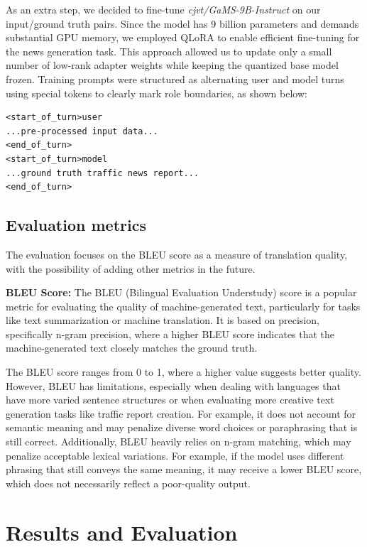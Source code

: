 \documentclass[fleqn,moreauthors,10pt]{ds_report}
\begin{document}
As an extra step, we decided to fine-tune \textit{cjvt/GaMS-9B-Instruct} on our input/ground truth pairs. Since the model has 9 billion parameters and demands substantial GPU memory, we employed QLoRA to enable efficient fine-tuning for the news generation task. This approach allowed us to update only a small number of low-rank adapter weights while keeping the quantized base model frozen. Training prompts were structured as alternating user and model turns using special tokens to clearly mark role boundaries, as shown below:

\begin{verbatim}
<start_of_turn>user
...pre-processed input data...
<end_of_turn>
<start_of_turn>model
...ground truth traffic news report...
<end_of_turn>
\end{verbatim}

\subsection*{Evaluation metrics}

The evaluation focuses on the BLEU score as a measure of translation quality, with the possibility of adding other metrics in the future.

\noindent \textbf{BLEU Score:} The BLEU (Bilingual Evaluation Understudy) score is a popular metric for evaluating the quality of machine-generated text, particularly for tasks like text summarization or machine translation. It is based on precision, specifically n-gram precision, where a higher BLEU score indicates that the machine-generated text closely matches the ground truth.

The BLEU score ranges from 0 to 1, where a higher value suggests better quality. However, BLEU has limitations, especially when dealing with languages that have more varied sentence structures or when evaluating more creative text generation tasks like traffic report creation. For example, it does not account for semantic meaning and may penalize diverse word choices or paraphrasing that is still correct. Additionally, BLEU heavily relies on n-gram matching, which may penalize acceptable lexical variations. For example, if the model uses different phrasing that still conveys the same meaning, it may receive a lower BLEU score, which does not necessarily reflect a poor-quality output.


\section{Results and Evaluation}
\end{document}
